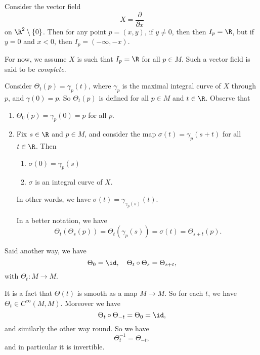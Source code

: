 \documentclass[a4paper]{article}
\begin{document}
\begin{eg}
  Consider the vector field
  \[
    X = \frac{\partial}{\partial x}
  \]
  on $\R^2 \setminus \{0\}$. Then for any point $p = (x, y)$, if $y \not= 0$, then then $I_p = \R$, but if $y = 0$ and $x < 0$, then $I_p = (-\infty, -x)$.
  \begin{center}
  \end{center}
\end{eg}

For now, we assume $X$ is such that $I_p = \R$ for all $p \in M$. Such a vector field is said to be \emph{complete}.

Consider $\Theta_t(p) = \gamma_p(t)$, where $\gamma_p$ is the maximal integral curve of $X$ through $p$, and $\gamma(0) = p$. So $\Theta_t(p)$ is defined for all $p \in M$ and $t \in \R$. Observe that
\begin{enumerate}
  \item $\Theta_0(p) = \gamma_p(0) = p$ for all $p$.
  \item Fix $s \in \R$ and $p \in M$, and consider the map $\sigma(t) = \gamma_p(s + t)$ for all $t \in \R$. Then
    \begin{enumerate}
      \item $\sigma(0) = \gamma_p(s)$
      \item $\sigma$ is an integral curve of $X$.
    \end{enumerate}
    In other words, we have $\sigma(t) = \gamma_{\gamma_p(s)}(t)$.

    In a better notation, we have
    \[
      \Theta_t(\Theta_s(p)) = \Theta_t(\gamma_p(s)) = \sigma(t) = \Theta_{s + t}(p).
    \]
\end{enumerate}

Said another way, we have
\[
  \Theta_0 = \id,\quad \Theta_t \circ \Theta_s = \Theta_{s + t},
\]
with $\Theta_t: M \to M$.

It is a fact that $\Theta(t)$ is smooth as a map $M \to M$. So for each $t$, we have $\Theta_t \in C^\infty(M, M)$. Moreover we have
\[
  \Theta_{t} \circ \Theta_{-t} = \Theta_0 = \id,
\]
and similarly the other way round. So we have
\[
  \Theta_t^{-1} = \Theta_{-t},
\]
and in particular it is invertible.
\end{document}
